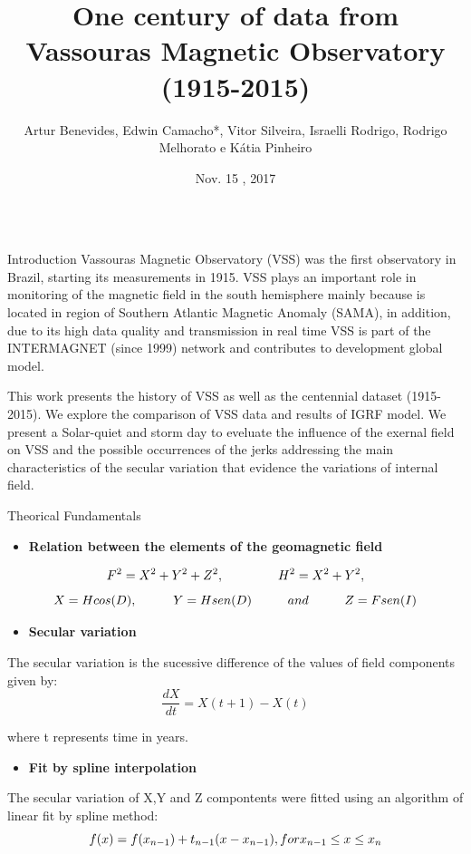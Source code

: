 \documentclass[final,t]{beamer}
\title{\huge One century of data from Vassouras Magnetic Observatory (1915-2015)}
\author[Benevides, Bassrei]{Artur Benevides, Edwin Camacho*, Vitor Silveira, Israelli Rodrigo, Rodrigo Melhorato e Kátia Pinheiro}
\institute[ON-MCTIC]{Observatório Nacional}
\date[Nov , 2017]{Nov. 15 , 2017}
\begin{document}
  \begin{columns}[t]
    \begin{column}{.47\linewidth}
\begin{block}{Introduction}
\justifying	
 Vassouras Magnetic Observatory (VSS) was the first observatory in Brazil, starting its measurements in 1915. VSS plays an important role in monitoring of the magnetic field in the south hemisphere mainly because is located in region of Southern Atlantic Magnetic Anomaly (SAMA), in addition, due to its high data quality and transmission in real time VSS is part of the INTERMAGNET (since 1999) network and contributes to development global model.
 
 This work presents the history of VSS as well as the centennial dataset (1915-2015). We	explore the comparison of VSS data and results of IGRF model. We present a Solar-quiet and storm day to eveluate the influence of the exernal field on VSS and the possible occurrences of the jerks addressing the main characteristics of the secular variation that evidence the variations of internal field.	

\end{block}		

	
	\begin{block}{Theorical Fundamentals}
		
		
		\begin{itemize}
			\item \textbf{Relation between the elements of the geomagnetic field}
		\end{itemize}	
		\[ F^{2} = X^{2} + Y^{2} + Z^{2}, \hspace{1.5cm} H^{2} = X^{2} + Y^{2}, \]
		\[	   X = Hcos(D), \hspace{1.0cm} Y = Hsen(D) \hspace{1.0cm} and \hspace{1.0cm} Z = Fsen(I)\]
	
		
		
		\begin{itemize}	
			\item \textbf{Secular variation}
		\end{itemize}
		The secular variation is the sucessive difference of the values of field components given by:
		\[\frac{dX}{dt} = X(t+1)-X(t)\]
		
		where t represents time in years.
		
		\begin{itemize}
			\item \textbf{Fit by spline interpolation}
		\end{itemize}
		The secular variation of X,Y and Z compontents were fitted using an algorithm  of linear fit by spline method: 
		\[ f(x)= f(x_{n-1})+t_{n-1}(x-x_{n-1}), \\
		for x_{n-1} \le x \le x_{n} \]\\
		

\end{block}
\end{column}
\end{columns}
\end{document}
